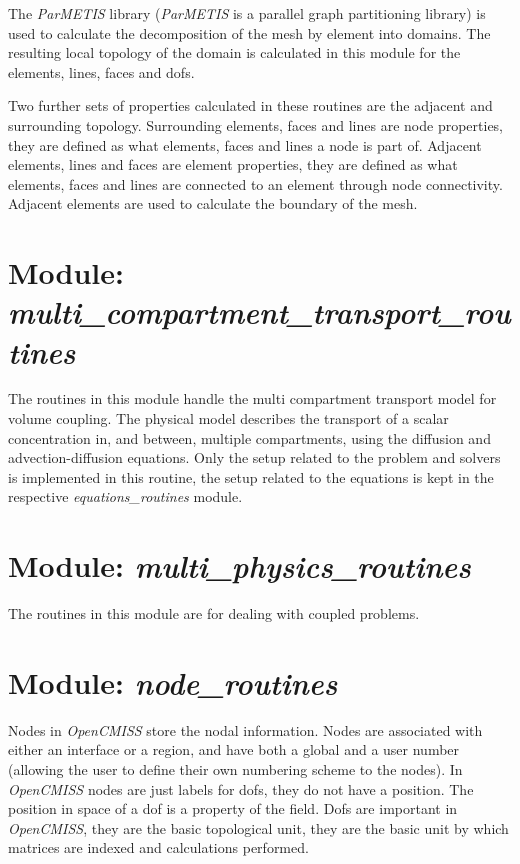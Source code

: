The \emph{ParMETIS} library (\emph{ParMETIS} is a parallel graph partitioning 
library) is used to calculate the decomposition of the mesh by element into 
domains. The resulting local topology of the domain is calculated in this 
module for the elements, lines, faces and dofs.

Two further sets of properties calculated in these routines are the adjacent 
and surrounding topology. Surrounding elements, faces and lines are node 
properties, they are defined as what elements, faces and lines a node is part 
of. Adjacent elements, lines and faces are element properties, they are defined 
as what elements, faces and lines are connected to an element through node 
connectivity. Adjacent elements are used to calculate the boundary of the mesh.


\section{Module: \\ \emph{multi\_compartment\_transport\_routines}}
\label{sec:multicompartmenttransportroutines}

The routines in this module handle the multi compartment transport model for 
volume coupling. The physical model describes the transport of a scalar 
concentration in, and between, multiple compartments, using the diffusion 
and advection-diffusion equations. Only the setup related to the problem and 
solvers is implemented in this routine, the setup related to the equations 
is kept in the respective \emph{equations\_routines} module. 


\section{Module: \emph{multi\_physics\_routines}}
\label{sec:multiphysicsroutines}

The routines in this module are for dealing with coupled problems.


\section{Module: \emph{node\_routines}}
\label{sec:noderoutines}

Nodes in \emph{OpenCMISS} store the nodal information. Nodes are 
associated with either an interface or a region, and have both a global 
and a user number (allowing the user to define their own numbering scheme 
to the nodes). In \emph{OpenCMISS} nodes are just labels for dofs, they 
do not have a position. The position in space of a dof is a property of 
the field. Dofs are important in \emph{OpenCMISS}, they are the basic 
topological unit, they are the basic unit by which matrices are indexed 
and calculations performed.


